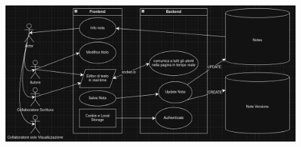 \documentclass[11pt]{article}
\begin{document}
\begin{figure}[H]
\begin{minipage}[t]{0.23\textwidth}
    \end{minipage}
    \begin{minipage}[t]{0.75\textwidth}
        \vspace{0pt}
        \includegraphics[width=\linewidth]{./Resources/Diagrams/UML-Nota.png}
    \end{minipage}\hfill
\end{figure}
\newpage
\end{document}
